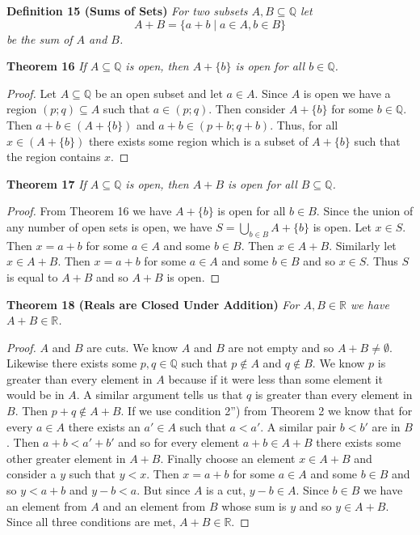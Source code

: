 \documentclass{article}
\begin{document}
\begin{flushleft}
\textbf{Definition 15 (Sums of Sets)}
\textsl{For two subsets $A, B \subseteq \mathbb{Q}$ let
\[
A+B = \{a+b \mid a \in A , b \in B\}
\]
be the sum of $A$ and $B$.}
\newline

\textbf{Theorem 16}
\textsl{If $A \subseteq \mathbb{Q}$ is open, then $A + \{b\}$ is open for all $b \in \mathbb{Q}$.}
\begin{proof}
Let $A \subseteq \mathbb{Q}$ be an open subset and let $a \in A$. Since $A$ is open we have a region $(p;q) \subseteq A$ such that $a \in (p;q)$. Then consider $A+\{b\}$ for some $b \in \mathbb{Q}$. Then $a+b \in (A + \{b\})$ and $a+b \in (p+b;q+b)$. Thus, for all $x \in (A + \{b\})$ there exists some region which is a subset of $A + \{b\}$ such that the region contains $x$.
\end{proof}

\textbf{Theorem 17}
\textsl{If $A \subseteq \mathbb{Q}$ is open, then $A+B$ is open for all $B \subseteq \mathbb{Q}$.}
\begin{proof}
From Theorem 16 we have $A + \{b\}$ is open for all $b \in B$. Since the union of any number of open sets is open, we have $S=\bigcup_{b \in B} A + \{b\}$ is open. Let $x \in S$. Then $x=a+b$ for some $a \in A$ and some $b \in B$. Then $x \in A+B$. Similarly let $x \in A+B$. Then $x=a+b$ for some $a \in A$ and some $b \in B$ and so $x \in S$. Thus $S$ is equal to $A + B$ and so $A + B$ is open.
\end{proof}

\textbf{Theorem 18 (Reals are Closed Under Addition)}
\textsl{For $A, B \in \mathbb{R}$ we have $A + B \in \mathbb{R}$.}
\begin{proof}
$A$ and $B$ are cuts. We know $A$ and $B$ are not empty and so $A+B \neq \emptyset$. Likewise there exists some $p,q \in \mathbb{Q}$ such that $p \notin A$ and $q \notin B$. We know $p$ is greater than every element in $A$ because if it were less than some element it would be in $A$. A similar argument tells us that $q$ is greater than every element in $B$. Then $p+q \notin A+B$. If we use condition 2'') from Theorem 2 we know that for every $a \in A$ there exists an $a' \in A$ such that $a<a'$. A similar pair $b<b'$ are in $B$. Then $a+b<a'+b'$ and so for every element $a+b \in A+B$ there exists some other greater element in $A+B$. Finally choose an element $x \in A+B$ and consider a $y$ such that $y<x$. Then $x = a+b$ for some $a \in A$ and some $b \in B$ and so $y<a+b$ and $y-b<a$. But since $A$ is a cut, $y-b \in A$. Since $b \in B$ we have an element from $A$ and an element from $B$ whose sum is $y$ and so $y \in A+B$. Since all three conditions are met, $A+B \in \mathbb{R}$.
\end{proof}


\end{flushleft}
\end{document}
